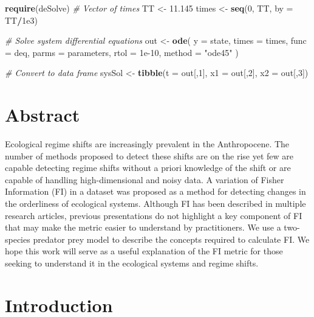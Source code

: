 \documentclass[12pt,twoside,openany]{reedthesis}
\newenvironment{Shaded}{\begin{snugshade}}{\end{snugshade}}
\newcommand{\CommentTok}[1]{\textcolor[rgb]{0.56,0.35,0.01}{\textit{#1}}}
\newcommand{\DataTypeTok}[1]{\textcolor[rgb]{0.13,0.29,0.53}{#1}}
\newcommand{\DecValTok}[1]{\textcolor[rgb]{0.00,0.00,0.81}{#1}}
\newcommand{\FloatTok}[1]{\textcolor[rgb]{0.00,0.00,0.81}{#1}}
\newcommand{\KeywordTok}[1]{\textcolor[rgb]{0.13,0.29,0.53}{\textbf{#1}}}
\newcommand{\NormalTok}[1]{#1}
\newcommand{\OperatorTok}[1]{\textcolor[rgb]{0.81,0.36,0.00}{\textbf{#1}}}
\newcommand{\StringTok}[1]{\textcolor[rgb]{0.31,0.60,0.02}{#1}}
\begin{document}
\begin{Shaded}
\begin{Highlighting}[]
\KeywordTok{require}\NormalTok{(deSolve)}
\CommentTok{# Vector of times}
\NormalTok{TT <-}\StringTok{  }\FloatTok{11.145}
\NormalTok{times <-}\StringTok{ }\KeywordTok{seq}\NormalTok{(}\DecValTok{0}\NormalTok{, TT, }\DataTypeTok{by =}\NormalTok{ TT}\OperatorTok{/}\FloatTok{1e3}\NormalTok{)}

\CommentTok{# Solve system differential equations}
\NormalTok{out <-}\StringTok{ }\KeywordTok{ode}\NormalTok{(}
  \DataTypeTok{y =}\NormalTok{ state,}
\NormalTok{  times}
\NormalTok{  =}\StringTok{ }\NormalTok{times,}
  \DataTypeTok{func =}\NormalTok{ deq,}
  \DataTypeTok{parms =}\NormalTok{ parameters,}
  \DataTypeTok{rtol =} \FloatTok{1e-10}\NormalTok{,}
  \DataTypeTok{method =} \StringTok{"ode45"}
\NormalTok{)}

\CommentTok{# Convert to data frame}
\NormalTok{sysSol <-}\StringTok{ }\KeywordTok{tibble}\NormalTok{(}\DataTypeTok{t =}\NormalTok{ out[,}\DecValTok{1}\NormalTok{], }\DataTypeTok{x1 =}\NormalTok{ out[,}\DecValTok{2}\NormalTok{], }\DataTypeTok{x2 =}\NormalTok{ out[,}\DecValTok{3}\NormalTok{]) }
\end{Highlighting}
\end{Shaded}
\hypertarget{abstract-1}{%
\section{Abstract}\label{abstract-1}}

Ecological regime shifts are increasingly prevalent in the Anthropocene. The number of methods proposed to detect these shifts are on the rise yet few are capable detecting regime shifts without a priori knowledge of the shift or are capable of handling high-dimensional and noisy data. A variation of Fisher Information (FI) in a dataset was proposed as a method for detecting changes in the orderliness of ecological systems. Although FI has been described in multiple research articles, previous presentations do not highlight a key component of FI that may make the metric easier to understand by practitioners. We use a two-species predator prey model to describe the concepts required to calculate FI. We hope this work will serve as a useful explanation of the FI metric for those seeking to understand it in the ecological systems and regime shifts.

\hypertarget{introduction-1}{%
\section{Introduction}\label{introduction-1}}
\end{document}
